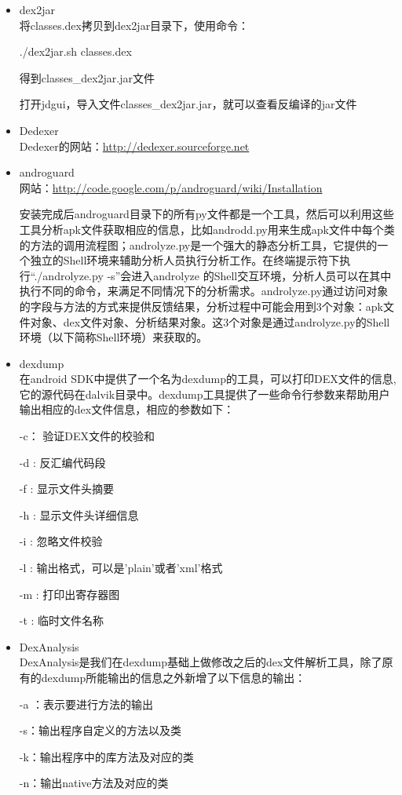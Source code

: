 \begin{itemize}
\item dex2jar\\
将classes.dex拷贝到dex2jar目录下，使用命令：

./dex2jar.sh classes.dex

得到classes\_dex2jar.jar文件

打开jdgui，导入文件classes\_dex2jar.jar，就可以查看反编译的jar文件

\item Dedexer\\
Dedexer的网站：\url{http://dedexer.sourceforge.net}

\item androguard\\
网站：\url{http://code.google.com/p/androguard/wiki/Installation}

安装完成后androguard目录下的所有py文件都是一个工具，然后可以利用这些工具分析apk文件获取相应的信息，比如androdd.py用来生成apk文件中每个类的方法的调用流程图；androlyze.py是一个强大的静态分析工具，它提供的一个独立的Shell环境来辅助分析人员执行分析工作。在终端提示符下执行“./androlyze.py -s”会进入androlyze 的Shell交互环境，分析人员可以在其中执行不同的命令，来满足不同情况下的分析需求。androlyze.py通过访问对象的字段与方法的方式来提供反馈结果，分析过程中可能会用到3个对象：apk文件对象、dex文件对象、分析结果对象。这3个对象是通过androlyze.py的Shell环境（以下简称Shell环境）来获取的。

\item dexdump\\
在android SDK中提供了一个名为dexdump的工具，可以打印DEX文件的信息,它的源代码在dalvik目录中。dexdump工具提供了一些命令行参数来帮助用户输出相应的dex文件信息，相应的参数如下：

-c： 验证DEX文件的校验和

-d :  反汇编代码段

-f : 显示文件头摘要

-h : 显示文件头详细信息

-i : 忽略文件校验

-l : 输出格式，可以是'plain'或者'xml'格式

-m :  打印出寄存器图

-t : 临时文件名称

\item DexAnalysis\\
DexAnalysis是我们在dexdump基础上做修改之后的dex文件解析工具，除了原有的dexdump所能输出的信息之外新增了以下信息的输出：

-a ：表示要进行方法的输出

-s：输出程序自定义的方法以及类

-k：输出程序中的库方法及对应的类

-n：输出native方法及对应的类

\end{itemize}

